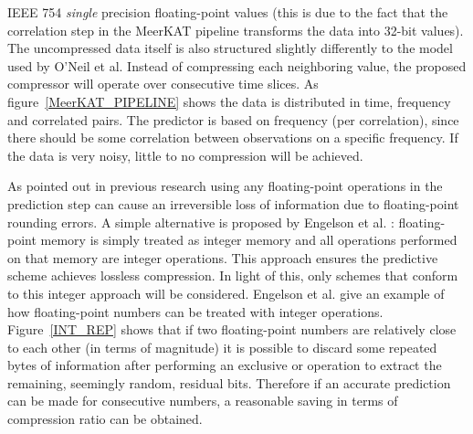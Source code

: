 IEEE 754 \textit{single} precision floating-point values (this is due to the fact that the correlation step in the MeerKAT pipeline transforms the data into 32-bit values). 
The uncompressed data itself is also structured slightly differently to the model used by O'Neil et al. Instead of compressing each neighboring value, the proposed compressor will operate 
over consecutive time slices. As figure~\ref{MeerKAT_PIPELINE} shows the data is distributed in time, frequency and correlated pairs. The predictor is based on frequency 
(per correlation), since there should be some correlation between observations on a specific frequency. If the data is very noisy, little to no compression will be achieved. 

As pointed out in previous research \cite{engelson2000lossless,lindstrom2006fast} using any floating-point operations in the prediction step can cause an irreversible loss of information due to floating-point
rounding errors. A simple alternative is proposed by Engelson et al. \cite{engelson2000lossless}: floating-point memory is simply treated as integer memory and all operations performed on that memory 
are integer operations. This approach ensures the predictive scheme achieves lossless compression. In light of this, only schemes that conform to this integer approach will be considered. Engelson et al. give an example 
of how floating-point numbers can be treated with integer operations. Figure~\ref{INT_REP} shows that if two floating-point numbers are relatively close to each other (in terms of magnitude) it is possible to discard 
some repeated bytes of information after performing an exclusive or operation to extract the remaining, seemingly random, residual bits. Therefore if an accurate prediction can be made for consecutive numbers, a 
reasonable saving in terms of compression ratio can be obtained.

